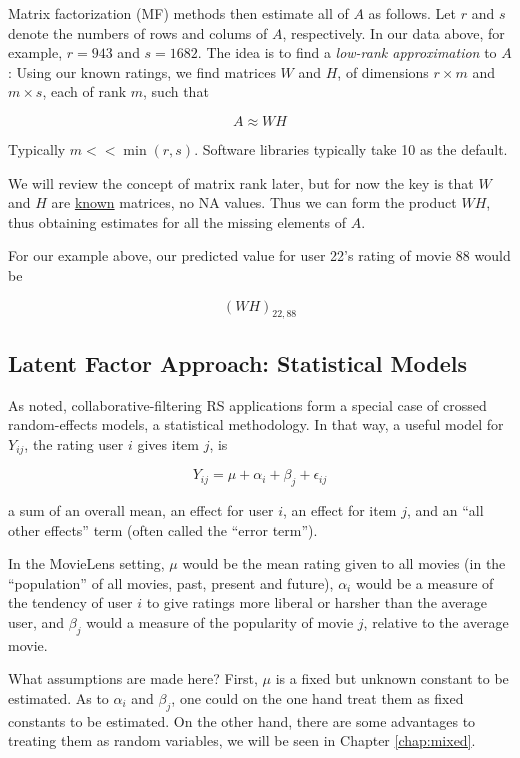 Matrix factorization (MF) methods then estimate all of $A$ as follows.
Let $r$ and $s$ denote the numbers of rows and colums of $A$,
respectively.  In our data above, for example, $r = 943$ and $s = 1682$.
The idea is to find a \textit{low-rank approximation} to $A$:  Using our
known ratings, we find matrices $W$ and $H$, of dimensions $r \times m$
and $m \times s$, each of rank $m$, such that 

\begin{equation}
A \approx WH
\end{equation}

Typically $m << \min(r,s)$.  Software libraries typically take 10 as the
default.

We will review the concept of matrix rank later, but for now the key is
that $W$ and $H$ are \underline{known} matrices, no NA values.  Thus we
can form the product $WH$, thus obtaining estimates for all the missing
elements of $A$.

For our example above, our predicted value for user 22's rating of
movie 88 would be

\begin{equation}
(WH)_{22,88}
\end{equation}

\subsection{Latent Factor Approach: Statistical Models}

As noted, collaborative-filtering RS applications form a special case of
crossed random-effects models, a statistical methodology.  In that way,
a useful model for $Y_{ij}$, the rating user $i$ gives item $j$, is

\begin{equation}
Y_{ij} = \mu + \alpha_i + \beta_j + \epsilon_{ij}
\end{equation}

a sum of an overall mean, an effect for user $i$, an effect for item
$j$, and an ``all other effects'' term (often called the ``error
term'').

In the MovieLens setting, $\mu$ would be the mean rating given to all
movies (in the ``population'' of all movies, past, present and future),
$\alpha_i$ would be a measure of the tendency of user $i$ to give
ratings more liberal or harsher than the average user, and $\beta_j$
would a measure of the popularity of movie $j$, relative to the average
movie.

What assumptions are made here?  First, $\mu$ is a fixed but unknown
constant to be estimated.  As to $\alpha_i$ and $\beta_j$, one could on
the one hand treat them as fixed constants to be estimated.  On the
other hand, there are some advantages to treating them as random
variables, we will be seen in Chapter \ref{chap:mixed}.

